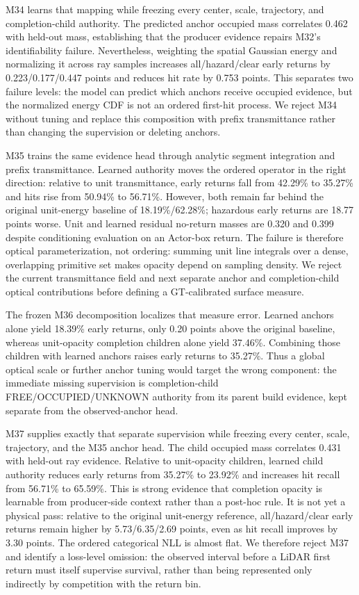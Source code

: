 M34 learns that mapping while freezing every center, scale, trajectory, and completion-child authority. The predicted
anchor occupied mass correlates 0.462 with held-out mass, establishing that the producer evidence repairs M32's
identifiability failure. Nevertheless, weighting the spatial Gaussian energy and normalizing it across ray samples increases
all/hazard/clear early returns by 0.223/0.177/0.447 points and reduces hit rate by 0.753 points. This separates two failure
levels: the model can predict which anchors receive occupied evidence, but the normalized energy CDF is not an ordered
first-hit process. We reject M34 without tuning and replace this composition with prefix transmittance rather than changing
the supervision or deleting anchors.

M35 trains the same evidence head through analytic segment integration and prefix transmittance. Learned authority moves
the ordered operator in the right direction: relative to unit transmittance, early returns fall from 42.29\% to 35.27\%
and hits rise from 50.94\% to 56.71\%. However, both remain far behind the original unit-energy baseline of
18.19\%/62.28\%; hazardous early returns are 18.77 points worse. Unit and learned residual no-return masses are
0.320 and 0.399 despite conditioning evaluation on an Actor-box return. The failure is therefore optical parameterization,
not ordering: summing unit line integrals over a dense, overlapping primitive set makes opacity depend on sampling density.
We reject the current transmittance field and next separate anchor and completion-child optical contributions before defining
a GT-calibrated surface measure.

The frozen M36 decomposition localizes that measure error. Learned anchors alone yield 18.39\% early returns, only
0.20 points above the original baseline, whereas unit-opacity completion children alone yield 37.46\%. Combining those
children with learned anchors raises early returns to 35.27\%. Thus a global optical scale or further anchor tuning would
target the wrong component: the immediate missing supervision is completion-child FREE/OCCUPIED/UNKNOWN authority from
its parent build evidence, kept separate from the observed-anchor head.

M37 supplies exactly that separate supervision while freezing every center, scale, trajectory, and the M35 anchor head.
The child occupied mass correlates 0.431 with held-out ray evidence. Relative to unit-opacity children, learned child
authority reduces early returns from 35.27\% to 23.92\% and increases hit recall from 56.71\% to 65.59\%. This is strong
evidence that completion opacity is learnable from producer-side context rather than a post-hoc rule. It is not yet a
physical pass: relative to the original unit-energy reference, all/hazard/clear early returns remain higher by
5.73/6.35/2.69 points, even as hit recall improves by 3.30 points. The ordered categorical NLL is almost flat. We therefore
reject M37 and identify a loss-level omission: the observed interval before a LiDAR first return must itself supervise
survival, rather than being represented only indirectly by competition with the return bin.

